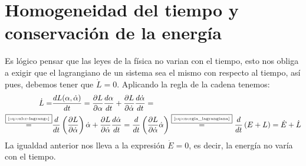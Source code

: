 \section{Homogeneidad del tiempo y conservación de la energía}
Es lógico pensar que las leyes de la física no varian con el tiempo, esto nos obliga a exigir que el lagrangiano de un sistema sea el mismo con respecto al tiempo, así pues, debemos tener que $\dot{L}=0$.
Aplicando la regla de la cadena tenemos:
\begin{align*}
	\dot{L}= & \frac{dL(\alpha, \dot{\alpha})}{dt}=\frac{\partial L}{\partial \alpha}\frac{d\alpha}{dt}+\frac{\partial L}{\partial \dot{\alpha}}\frac{d\dot{\alpha}}{dt} = \\
	\overset{\fbox{\tiny \ref{eq:euler-lagrange}}}{=} & \frac{d}{dt}\left(\frac{\partial L}{\partial \dot{\alpha}}\right)\dot{\alpha}+\frac{\partial L}{\partial \dot{\alpha}}\frac{d\dot{\alpha}}{dt}=\frac{d}{dt}\left(\frac{\partial L}{\partial \dot{\alpha}}\dot{\alpha}\right)\overset{\fbox{\tiny \ref{eq:energia_lagrangiana}}}{=}\frac{d}{dt}\left(E+L\right)=\dot{E}+\dot{L}
\end{align*}
La igualdad anterior nos lleva a la expresión $\dot{E}=0$, es decir, la energía no varía con el tiempo.
